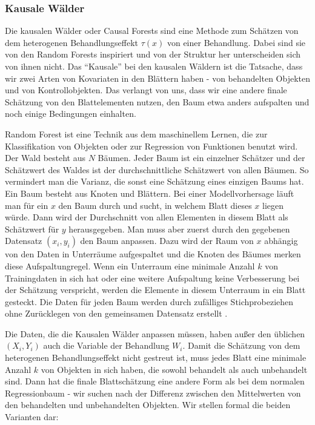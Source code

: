 \documentclass[12pt,a4paper,twoside]{scrartcl}
\numberwithin{equation}{section}
\begin{document}
\subsubsection{Kausale Wälder}\label{subsubsec:kausaleWälder}
Die kausalen Wälder oder Causal Forests sind eine Methode zum Schätzen von dem heterogenen Behandlungseffekt $\tau(x)$ von einer Behandlung. Dabei sind sie von den Random Forests inspiriert und von der Struktur her unterscheiden sich von ihnen nicht. Das \enquote{Kausale} bei den kausalen Wäldern ist die Tatsache, dass wir zwei Arten von Kovariaten in den Blättern haben - von behandelten Objekten und von Kontrollobjekten. Das verlangt von uns, dass wir eine andere finale Schätzung von den Blattelementen nutzen, den Baum etwa anders aufspalten und noch einige Bedingungen einhalten\cite{wager2018estimation}. \par

\noindent
Random Forest ist eine Technik aus dem maschinellem Lernen, die zur Klassifikation von Objekten oder zur Regression von Funktionen benutzt wird. Der Wald besteht aus $N$ Bäumen. Jeder Baum ist ein einzelner Schätzer und der Schätzwert des Waldes ist der durchschnittliche Schätzwert von allen Bäumen. So vermindert man die Varianz, die sonst eine Schätzung eines einzigen Baums hat. Ein Baum besteht aus Knoten und Blättern. Bei einer Modellvorhersage läuft man für ein $x$ den Baum durch und sucht, in welchem Blatt dieses $x$ liegen würde. Dann wird der Durchschnitt von allen Elementen in diesem Blatt als Schätzwert für $y$ herausgegeben. Man muss aber zuerst durch den gegebenen Datensatz $(x_i,y_i)$ den Baum anpassen. Dazu wird der Raum von $x$ abhängig von den Daten in Unterräume aufgespaltet und die Knoten des Bäumes merken diese Aufspaltungregel. Wenn ein Unterraum eine minimale Anzahl $k$ von Trainingdaten in sich hat oder eine weitere Aufspaltung keine Verbesserung bei der Schätzung verspricht, werden die Elemente in diesem Unterraum in ein Blatt gesteckt. Die Daten für jeden Baum werden durch zufälliges Stichprobeziehen ohne Zurücklegen von den gemeinsamen Datensatz erstellt \cite{breiman2001random}.\par

\noindent
Die Daten, die die Kausalen Wälder anpassen müssen, haben außer den üblichen $(X_i,Y_i)$ auch die Variable der Behandlung $W_i$. Damit die Schätzung von dem heterogenen Behandlungseffekt nicht gestreut ist, muss jedes Blatt eine minimale Anzahl $k$ von Objekten in sich haben, die sowohl behandelt als auch unbehandelt sind. Dann hat die finale Blattschätzung eine andere Form als bei dem normalen Regressionbaum - wir suchen nach der Differenz zwischen den Mittelwerten von den behandelten und unbehandelten Objekten\cite{wager2018estimation}. Wir stellen formal die beiden Varianten dar: \par 
\end{document}
